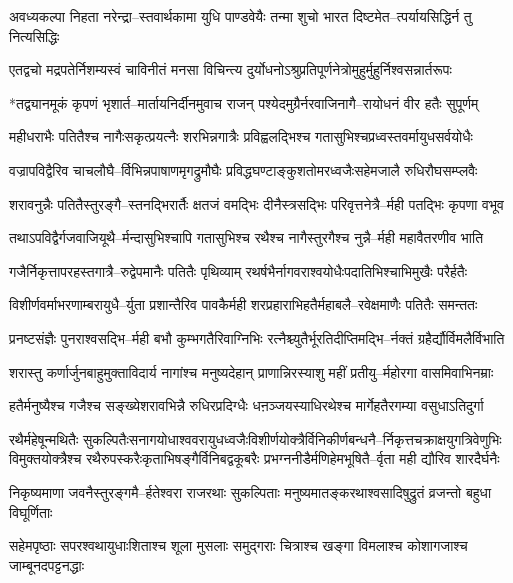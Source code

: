 \twolineshloka
{अवध्यकल्पा निहता नरेन्द्रा--स्तवार्थकामा युधि पाण्डवेयैः}
{तन्मा शुचो भारत दिष्टमेत--त्पर्यायसिद्धिर्न तु नित्यसिद्धिः}


\twolineshloka
{एतद्वचो मद्रपतेर्निशम्यस्वं चाविनीतं मनसा विचिन्त्य}
{दुर्योधनोऽश्रुप्रतिपूर्णनेत्रोमुहुर्मुहुर्निश्वसन्नार्तरूपः}


\twolineshloka
{*तद्व्यानमूकं कृपणं भृशार्त--मार्तायनिर्दीनमुवाच राजन्}
{पश्येदमुग्रैर्नरवाजिनागै--रायोधनं वीर हतैः सुपूर्णम्}


\twolineshloka
{महीधराभैः पतितैश्च नागैःसकृत्प्रयत्नैः शरभिन्नगात्रैः}
{प्रविह्वलद्भिश्च गतासुभिश्चप्रध्वस्तवर्मायुधसर्वयोधैः}


\twolineshloka
{वज्रापविद्वैरिव चाचलौघै--र्विभिन्नपाषाणमृगद्रुमौघैः}
{प्रविद्धघण्टाङ्कुशतोमरध्वजैःसहेमजालै रुधिरौघसम्प्लवैः}


\twolineshloka
{शरावनुन्नैः पतितैस्तुरङ्गै--स्तनद्भिरार्तैः क्षतजं वमद्भिः}
{दीनैस्त्रसद्भिः परिवृत्तनेत्रै--र्मही पतद्भिः कृपणा वभूव}


\twolineshloka
{तथाऽपविद्वैर्गजवाजियूथै--र्मन्दासुभिश्चापि गतासुभिश्च}
{रथैश्च नागैस्तुरगैश्च नुन्नै--र्मही महावैतरणीव भाति}


\twolineshloka
{गजैर्निकृत्तापरहस्तगात्रै--रुद्वेपमानैः पतितैः पृथिव्याम्}
{रथर्षभैर्नागवराश्वयोधैःपदातिभिश्चाभिमुखैः परैर्हतैः}


\twolineshloka
{विशीर्णवर्माभरणाम्बरायुधै--र्युता प्रशान्तैरिव पावकैर्मही}
{शरप्रहाराभिहतैर्महाबलै--रवेक्षमाणैः पतितैः समन्ततः}


\twolineshloka
{प्रनष्टसंज्ञैः पुनराश्वसद्भि--र्मही बभौ कुम्भगतैरिवाग्निभिः}
{रत्नैश्च्युतैर्भूरतिदीप्तिमद्भि--र्नक्तं ग्रहैर्द्यौर्विमलैर्विभाति}


\twolineshloka
{शरास्तु कर्णार्जुनबाहुमुक्ताविदार्य नागांश्च मनुष्यदेहान्}
{प्राणान्निरस्याशु महीं प्रतीयु--र्महोरगा वासमिवाभिनम्राः}


\twolineshloka
{हतैर्मनुष्यैश्च गजैश्च सङ्ख्येशरावभिन्नै रुधिरप्रदिग्धैः}
{धऩञ्जयस्याधिरथेश्च मार्गेहतैरगम्या वसुधाऽतिदुर्गा}


रथैर्महेषून्मथितैः सुकल्पितैःसनागयोधाश्ववरायुधध्वजैःविशीर्णयोक्त्रैर्विनिकीर्णबन्धनै--र्निकृत्तचक्राक्षयुगत्रिवेणुभिः
\twolineshloka
{विमुक्तयोक्त्रैश्च रथैरुपस्करैःकृताभिषङ्गैर्विनिबद्वकूबरैः}
{प्रभग्ननीडैर्मणिहेमभूषितै--र्वृता मही द्यौरिव शारदैर्घनैः}


\twolineshloka
{निकृष्यमाणा जवनैस्तुरङ्गमै--र्हतेश्वरा राजरथाः सुकल्पिताः}
{मनुष्यमातङ्करथाश्वसादिषुद्रुतं व्रजन्तो बहुधा विघूर्णिताः}


\twolineshloka
{सहेमपृष्ठाः सपरश्वथायुधाःशिताश्च शूला मुसलाः समुद्गराः}
{चित्राश्च खङ्गा विमलाश्च कोशागजाश्च जाम्बूनदपट्टनद्धाः}


